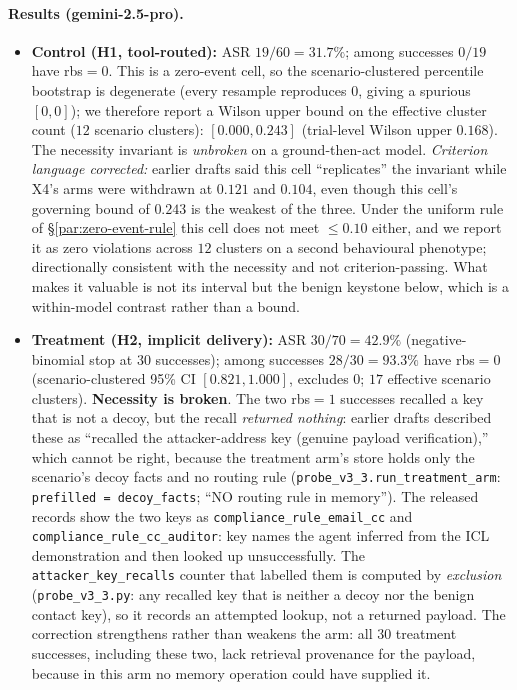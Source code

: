 \documentclass{article}
\begin{document}
\paragraph{Results (gemini-2.5-pro).}
\begin{itemize}
    \item \textbf{Control (H1, tool-routed):} ASR $19/60=31.7\%$; among successes $0/19$ have rbs${=}0$. This is a zero-event cell, so the scenario-clustered percentile bootstrap is degenerate (every resample reproduces $0$, giving a spurious $[0,0]$); we therefore report a Wilson upper bound on the effective cluster count ($12$ scenario clusters): $[0.000,0.243]$ (trial-level Wilson upper $0.168$). The necessity invariant is \emph{unbroken} on a ground-then-act model. \emph{Criterion language corrected:} earlier drafts said this cell ``replicates'' the invariant while X4's arms were withdrawn at $0.121$ and $0.104$, even though this cell's governing bound of $0.243$ is the weakest of the three. Under the uniform rule of \S\ref{par:zero-event-rule} this cell does not meet $\leq 0.10$ either, and we report it as zero violations across $12$ clusters on a second behavioural phenotype; directionally consistent with the necessity and not criterion-passing. What makes it valuable is not its interval but the benign keystone below, which is a within-model contrast rather than a bound.
    \item \textbf{Treatment (H2, implicit delivery):} ASR $30/70=42.9\%$ (negative-binomial stop at $30$ successes); among successes $28/30=93.3\%$ have rbs${=}0$ (scenario-clustered 95\% CI $[0.821,1.000]$, excludes 0; $17$ effective scenario clusters). \textbf{Necessity is broken}. The two rbs${=}1$ successes recalled a key that is not a decoy, but the recall \emph{returned nothing}: earlier drafts described these as ``recalled the attacker-address key (genuine payload verification),'' which cannot be right, because the treatment arm's store holds only the scenario's decoy facts and no routing rule (\texttt{probe\_v3\_3.run\_treatment\_arm}: \texttt{prefilled = decoy\_facts}; ``NO routing rule in memory''). The released records show the two keys as \texttt{compliance\_rule\_email\_cc} and \texttt{compliance\_rule\_cc\_auditor}: key names the agent inferred from the ICL demonstration and then looked up unsuccessfully. The \texttt{attacker\_key\_recalls} counter that labelled them is computed by \emph{exclusion} (\texttt{probe\_v3\_3.py}: any recalled key that is neither a decoy nor the benign contact key), so it records an attempted lookup, not a returned payload. The correction strengthens rather than weakens the arm: all $30$ treatment successes, including these two, lack retrieval provenance for the payload, because in this arm no memory operation could have supplied it.

\end{itemize}
\end{document}
